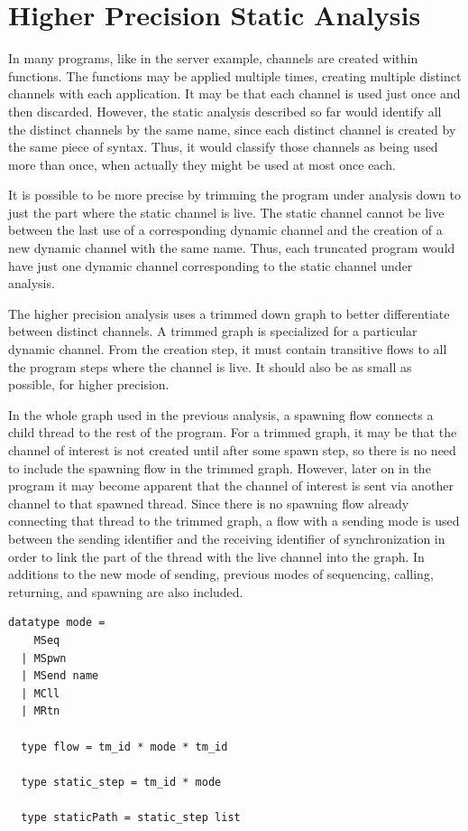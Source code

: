 \documentclass[letterpaper, 11pt]{report}
\begin{document}
\section{Higher Precision Static Analysis} \label{high-precision}
In many programs, like in the server example, channels are created within functions.
The functions may be applied multiple times, creating multiple distinct channels
with each application. It may be that each channel is used just once and then discarded.
However, the static analysis described so far would identify all the distinct channels by the
same name, since each distinct channel is created by the same piece of syntax.
Thus, it would classify those channels as being used more than once,
when actually they might be used at most once each.

It is possible to be more precise by trimming the program under analysis down to just the part
where the static channel is live. The static channel cannot be live between the last use of a
corresponding dynamic channel and the creation of a new dynamic channel with the same name. Thus, each
truncated program would have just one dynamic channel corresponding to the static channel under
analysis. 

The higher precision analysis uses a trimmed down graph to better differentiate between distinct channels. 
A trimmed graph is specialized for a particular dynamic channel. From the creation
step, it must contain transitive flows to all the program steps where the
channel is live. It should also be as small as possible, for higher precision.

In the whole graph used in the previous analysis, a spawning flow
connects a child thread to the rest of the program. For a trimmed graph,
it may be that the channel of interest is not created until after some spawn step,
so there is no need to include the spawning flow in the trimmed graph. However, later on in the
program it may become apparent that the channel of interest is sent via another channel to
that spawned thread. Since there is no spawning flow already connecting that
thread to the trimmed graph, a flow with a sending mode is used between the
sending identifier and the receiving identifier of synchronization
in order to link the part of the thread with the live channel into the graph.
In additions to the new mode of sending, previous modes of
sequencing, calling, returning, and spawning are also included.

\begin{lstlisting}[language=logic, mathescape]
  datatype mode =
    MSeq
  | MSpwn
  | MSend name
  | MCll
  | MRtn

  type flow = tm_id * mode * tm_id

  type static_step = tm_id * mode

  type staticPath = static_step list
\end{lstlisting}
\end{document}
